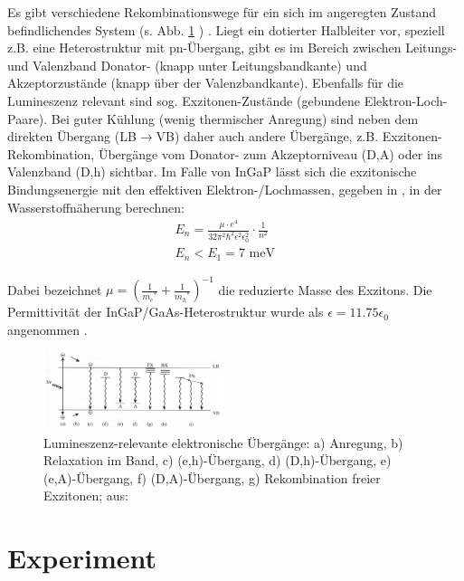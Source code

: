 \documentclass[aps,twocolumn,secnumarabic,nobalancelastpage,amsmath,amssymb,
nofootinbib,superscriptaddress]{revtex4-1}
\begin{document}
\noindent Es gibt verschiedene Rekombinationswege für ein sich im angeregten Zustand befindlichendes System (s. Abb. \ref{fig:rekomb} ) \cite{saarland}.
Liegt ein dotierter Halbleiter vor, speziell z.B. eine Heterostruktur mit pn-Übergang, gibt es im Bereich zwischen Leitungs-
und Valenzband Donator- (knapp unter Leitungsbandkante) und Akzeptorzustände (knapp über der Valenzbandkante). Ebenfalls für die
Lumineszenz relevant sind sog. Exzitonen-Zustände (gebundene Elektron-Loch-Paare). Bei guter Kühlung (wenig thermischer
Anregung) sind neben dem direkten Übergang (LB$\rightarrow$VB) daher auch andere Übergänge, z.B. Exzitonen-Rekombination,
Übergänge vom Donator- zum Akzeptorniveau (D,A) oder ins Valenzband (D,h) sichtbar. Im Falle von InGaP lässt sich die exzitonische
Bindungsenergie mit den effektiven Elektron-/Lochmassen, gegeben in \cite{anleitung}, in der Wasserstoffnäherung berechnen:
\begin{eqnarray}
  E_{n} = \frac{\mu\cdot e^4}{32\pi^2\hbar^2\epsilon^2\epsilon_0^2}\cdot\frac{1}{n^2}
  \\[6pt]
  \nonumber
  E_{n}<E_{1} = 7\text{ meV}\;\;\;\;\,\,\,
  \label{eq:exitEbind}
\end{eqnarray}

\noindent Dabei bezeichnet $\mu=\left(\frac{1}{{m_e}^*} +\frac{1}{{m_h}^*}\right)^{-1}$ die reduzierte Masse des Exzitons.
Die Permittivität der InGaP/GaAs-Heterostruktur wurde als $\epsilon=11.75\epsilon_0$ angenommen \cite{dielek}.

\begin{figure}[h]
  \centering
  \includegraphics[width=0.47\textwidth]{img/rekombinationswege.jpg}
  \caption{ Lumineszenz-relevante elektronische Übergänge: a) Anregung, b) Relaxation im Band,
  c) (e,h)-Übergang, d) (D,h)-Übergang, e) (e,A)-Übergang, f) (D,A)-Übergang, g) Rekombination freier Exzitonen; aus: \cite{saarland}}
  \label{fig:rekomb}
\end{figure}



\section{Experiment}
\end{document}
